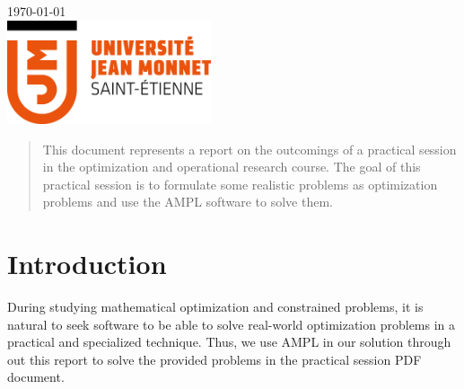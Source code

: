 \begin{titlepage}


{\large \today}\\[2cm] %


\includegraphics[width=60mm]{logo.png}\\[1cm] %
 

\vfill %

\end{titlepage}


\begin{abstract}
This document represents a report on the outcomings of a practical session in the optimization and operational research course. The goal of this practical session is to formulate some realistic problems as optimization problems and use the AMPL software to solve them.
\end{abstract}

\section{Introduction}

During studying mathematical optimization and constrained problems, it is natural to seek software to be able to solve real-world optimization problems in a practical and specialized technique. Thus, we use AMPL in our solution through out this report to solve the provided problems in the practical session PDF document.


